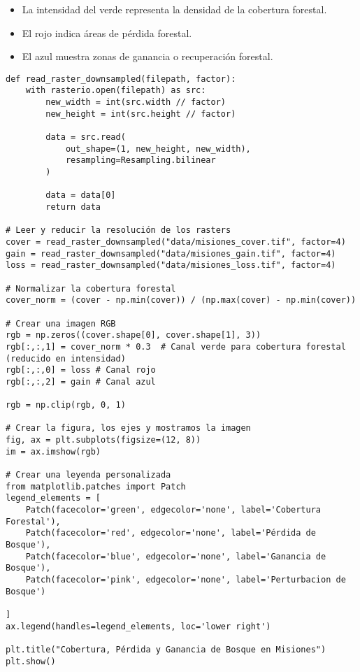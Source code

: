 \documentclass[11pt]{article}
\begin{document}
\begin{itemize}
    \item La intensidad del verde representa la densidad de la cobertura forestal.
    \item El rojo indica áreas de pérdida forestal.
    \item El azul muestra zonas de ganancia o recuperación forestal.
\end{itemize}

\begin{verbatim}
def read_raster_downsampled(filepath, factor):
    with rasterio.open(filepath) as src:
        new_width = int(src.width // factor)
        new_height = int(src.height // factor)

        data = src.read(
            out_shape=(1, new_height, new_width),
            resampling=Resampling.bilinear
        )

        data = data[0]
        return data

# Leer y reducir la resolución de los rasters
cover = read_raster_downsampled("data/misiones_cover.tif", factor=4)
gain = read_raster_downsampled("data/misiones_gain.tif", factor=4)
loss = read_raster_downsampled("data/misiones_loss.tif", factor=4)

# Normalizar la cobertura forestal
cover_norm = (cover - np.min(cover)) / (np.max(cover) - np.min(cover))

# Crear una imagen RGB
rgb = np.zeros((cover.shape[0], cover.shape[1], 3))
rgb[:,:,1] = cover_norm * 0.3  # Canal verde para cobertura forestal (reducido en intensidad)
rgb[:,:,0] = loss # Canal rojo
rgb[:,:,2] = gain # Canal azul

rgb = np.clip(rgb, 0, 1)

# Crear la figura, los ejes y mostramos la imagen
fig, ax = plt.subplots(figsize=(12, 8))
im = ax.imshow(rgb)

# Crear una leyenda personalizada
from matplotlib.patches import Patch
legend_elements = [
    Patch(facecolor='green', edgecolor='none', label='Cobertura Forestal'),
    Patch(facecolor='red', edgecolor='none', label='Pérdida de Bosque'),
    Patch(facecolor='blue', edgecolor='none', label='Ganancia de Bosque'),
    Patch(facecolor='pink', edgecolor='none', label='Perturbacion de Bosque')

]
ax.legend(handles=legend_elements, loc='lower right')

plt.title("Cobertura, Pérdida y Ganancia de Bosque en Misiones")
plt.show()
\end{verbatim}
\end{document}
